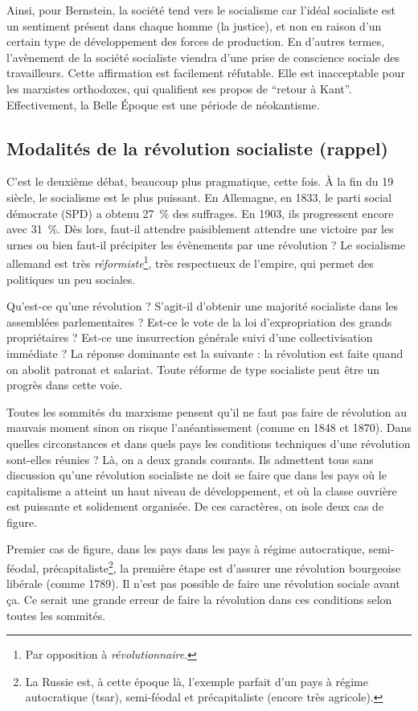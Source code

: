 \documentclass[12pt]{report}
\begin{document}
Ainsi, pour Bernstein, la société tend vers le socialisme car l’idéal socialiste est un sentiment présent dans chaque homme (la justice), et non en raison d'un certain type de développement des forces de production.
En d'autres termes, l’avènement de la société socialiste viendra d’une prise de conscience sociale des travailleurs. 
Cette affirmation est facilement réfutable.
Elle est inacceptable pour les marxistes orthodoxes, qui qualifient ses propos de \enquote{retour à Kant}.
Effectivement, la Belle Époque est une période de néokantisme.

\subsection{Modalités de la révolution socialiste (rappel)}

C'est le deuxième débat, beaucoup plus pragmatique, cette fois. 
À la fin du 19 siècle, le socialisme est le plus puissant.
En Allemagne, en 1833, le parti social démocrate (SPD) a obtenu 27~\% des suffrages.
En 1903, ils progressent encore avec 31~\%.
Dès lors, faut-il attendre paisiblement attendre une victoire par les urnes ou bien faut-il précipiter les évènements par une révolution ?
Le socialisme allemand est très \emph{réformiste}\footnote{Par opposition à \emph{révolutionnaire}.}, très respectueux de l'empire, qui permet des politiques un peu sociales.

Qu'est-ce qu'une révolution ?
S’agit-il d’obtenir une majorité socialiste dans les assemblées parlementaires ? 
Est-ce le vote de la loi d’expropriation des grands propriétaires ? 
Est-ce une insurrection générale suivi d’une collectivisation immédiate ? 
La réponse dominante est la suivante : la révolution est faite quand on abolit patronat et salariat.
Toute réforme de type socialiste peut être un progrès dans cette voie. 

Toutes les sommités du marxisme pensent qu’il ne faut pas faire de révolution au mauvais moment sinon on risque l’anéantissement (comme en 1848 et 1870).
Dans quelles circonstances et dans quels pays les conditions techniques d’une révolution sont-elles réunies ?
Là, on a deux grands courants.
Ils admettent tous sans discussion qu'une révolution socialiste ne doit se faire que dans les pays où le capitalisme a atteint un haut niveau de développement, et où la classe ouvrière est puissante et solidement organisée.
De ces caractères, on isole deux cas de figure.

Premier cas de figure, dans les pays dans les pays à régime autocratique, semi-féodal, précapitaliste\footnote{La Russie est, à cette époque là, l'exemple parfait d'un pays à régime autocratique (tsar), semi-féodal et précapitaliste (encore très agricole).}, la première étape est d’assurer une révolution bourgeoise libérale (comme 1789).
Il n’est pas possible de faire une révolution sociale avant ça.
Ce serait une grande erreur de faire la révolution dans ces conditions selon toutes les sommités.
\end{document}
